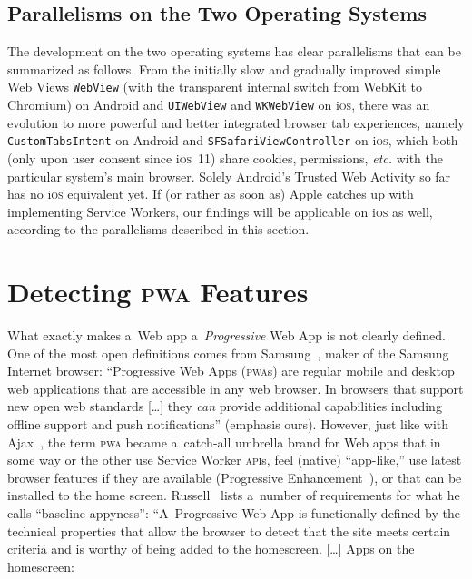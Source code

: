 \documentclass[sigconf]{acmart}
\begin{document}
\subsection{Parallelisms on the Two Operating Systems}

The development on the two operating systems has clear parallelisms
that can be summarized as follows.
From the initially slow and gradually improved simple Web Views \texttt{WebView}
(with the transparent internal switch from WebKit to Chromium)
on Android and \texttt{UIWebView} and \texttt{WKWebView} on i\textsc{os},
there was an evolution to more powerful and better integrated browser tab experiences,
namely \texttt{CustomTabsIntent} on Android and
\texttt{SFSafariViewController} on i\textsc{os},
which both (only upon user consent since i\textsc{os}~11)
share cookies, permissions, \emph{etc.}
with the particular system's main browser.
Solely Android's Trusted Web Activity so far has no i\textsc{os} equivalent yet.
If (or rather as soon as) Apple catches up with implementing Service Workers,
our findings will be applicable on i\textsc{os} as well,
according to the parallelisms described in this section.

\section{Detecting \textsc{pwa} Features}
\label{sec:pwa-feature-detector}

What exactly makes a~Web app a~\emph{Progressive} Web App is not clearly defined.
One of the most open definitions comes from Samsung~\cite{samsung2017pwa},
maker of the Samsung Internet browser:
``Progressive Web Apps (\textsc{pwa}s) are regular mobile and desktop web applications
that are accessible in any web browser.
In browsers that support new open web standards [\ldots]
they \emph{can} provide additional capabilities
including offline support and push notifications'' (emphasis ours).
However, just like with Ajax~\cite{garret2005ajax}, the term \textsc{pwa}
became a~catch-all umbrella brand for Web apps
that in some way or the other use Service Worker \textsc{api}s,
feel (native) ``app-like,'' use latest browser features if they are available
(Progressive Enhancement~\cite{champeon2003progressiveenhancement}),
or that can be installed to the home screen.
Russell~\cite{russell2016pwa} lists a~number of requirements 
for what he calls ``baseline appyness'':
``A~Progressive Web App is functionally defined by the technical properties
that allow the browser to detect that the site meets certain criteria
and is worthy of being added to the homescreen.
[\ldots]
Apps on the homescreen:
\end{document}
